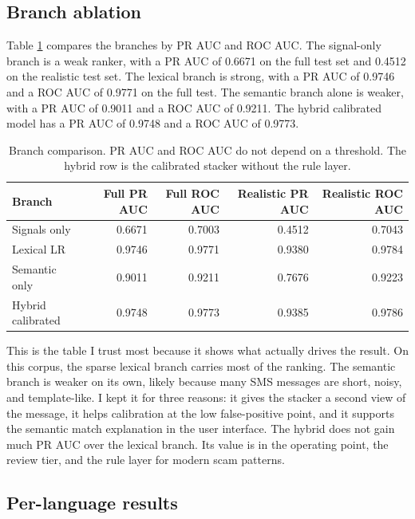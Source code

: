 \documentclass[11pt]{article}
\begin{document}
\subsection{Branch ablation}

Table \ref{tab:ablation} compares the branches by PR AUC and ROC AUC. The signal-only branch is a weak ranker, with a PR AUC of 0.6671 on the full test set and 0.4512 on the realistic test set. The lexical branch is strong, with a PR AUC of 0.9746 and a ROC AUC of 0.9771 on the full test. The semantic branch alone is weaker, with a PR AUC of 0.9011 and a ROC AUC of 0.9211. The hybrid calibrated model has a PR AUC of 0.9748 and a ROC AUC of 0.9773.

\begin{table}[htbp]
\centering
\small
\caption{Branch comparison. PR AUC and ROC AUC do not depend on a threshold. The hybrid row is the calibrated stacker without the rule layer.}
\label{tab:ablation}
\begin{tabular}{lrrrr}
\toprule
Branch & Full PR AUC & Full ROC AUC & Realistic PR AUC & Realistic ROC AUC \\
\midrule
Signals only & 0.6671 & 0.7003 & 0.4512 & 0.7043 \\
Lexical LR & 0.9746 & 0.9771 & 0.9380 & 0.9784 \\
Semantic only & 0.9011 & 0.9211 & 0.7676 & 0.9223 \\
Hybrid calibrated & 0.9748 & 0.9773 & 0.9385 & 0.9786 \\
\bottomrule
\end{tabular}
\end{table}

This is the table I trust most because it shows what actually drives the result. On this corpus, the sparse lexical branch carries most of the ranking. The semantic branch is weaker on its own, likely because many SMS messages are short, noisy, and template-like. I kept it for three reasons: it gives the stacker a second view of the message, it helps calibration at the low false-positive point, and it supports the semantic match explanation in the user interface. The hybrid does not gain much PR AUC over the lexical branch. Its value is in the operating point, the review tier, and the rule layer for modern scam patterns.

\subsection{Per-language results}
\end{document}
